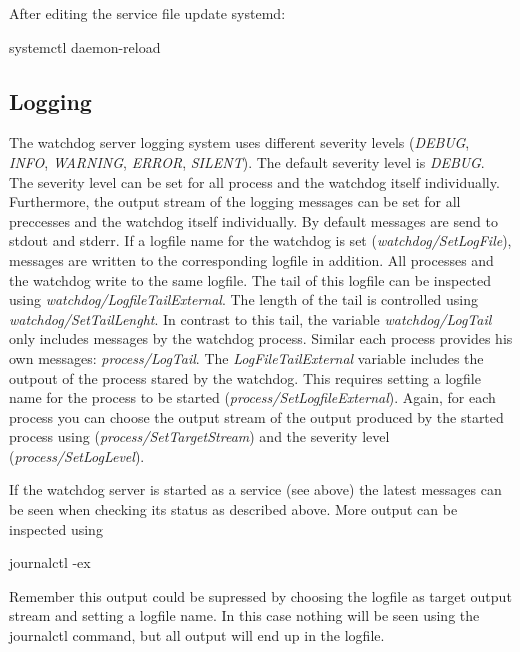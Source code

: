 After editing the service file update systemd\+: \begin{DoxyVerb}systemctl daemon-reload
\end{DoxyVerb}


\subsection*{Logging}

The watchdog server logging system uses different severity levels ({\itshape D\+E\+B\+UG}, {\itshape I\+N\+FO}, {\itshape W\+A\+R\+N\+I\+NG}, {\itshape E\+R\+R\+OR}, {\itshape S\+I\+L\+E\+NT}). The default severity level is {\itshape D\+E\+B\+UG}. The severity level can be set for all process and the watchdog itself individually. Furthermore, the output stream of the logging messages can be set for all preccesses and the watchdog itself individually. By default messages are send to stdout and stderr. If a logfile name for the watchdog is set ({\itshape watchdog/\+Set\+Log\+File}), messages are written to the corresponding logfile in addition. All processes and the watchdog write to the same logfile. The tail of this logfile can be inspected using {\itshape watchdog/\+Logfile\+Tail\+External}. The length of the tail is controlled using {\itshape watchdog/\+Set\+Tail\+Lenght}. In contrast to this tail, the variable {\itshape watchdog/\+Log\+Tail} only includes messages by the watchdog process. Similar each process provides his own messages\+: {\itshape process/\+Log\+Tail}. The {\itshape Log\+File\+Tail\+External} variable includes the outpout of the process stared by the watchdog. This requires setting a logfile name for the process to be started ({\itshape process/\+Set\+Logfile\+External}). Again, for each process you can choose the output stream of the output produced by the started process using ({\itshape process/\+Set\+Target\+Stream}) and the severity level ({\itshape process/\+Set\+Log\+Level}).

If the watchdog server is started as a service (see above) the latest messages can be seen when checking its status as described above. More output can be inspected using \begin{DoxyVerb}journalctl -ex
\end{DoxyVerb}


Remember this output could be supressed by choosing the logfile as target output stream and setting a logfile name. In this case nothing will be seen using the {\ttfamily journalctl} command, but all output will end up in the logfile. 